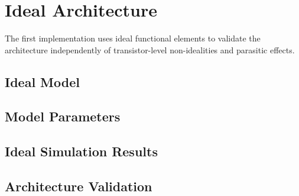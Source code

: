 
\section{Ideal Architecture}
\label{sec:ideal_architecture}

\begin{designnote}

The first implementation uses ideal functional elements to validate
the architecture independently of transistor-level non-idealities
and parasitic effects.

\end{designnote}


\subsection{Ideal Model}



\subsection{Model Parameters}



\subsection{Ideal Simulation Results}



\subsection{Architecture Validation}

